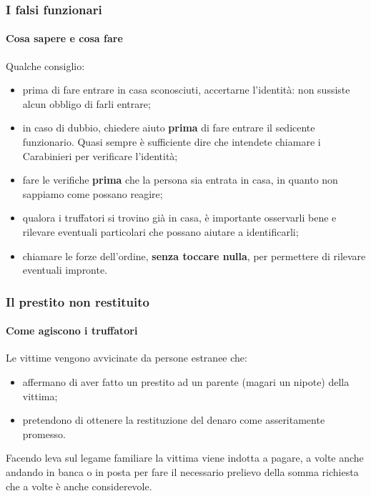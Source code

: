 \documentclass[11pt]{beamer}
\begin{document}
	\begin{frame}
		\frametitle{I falsi funzionari}
		\framesubtitle{Cosa sapere e cosa fare}
		
		Qualche consiglio:
		
		\begin{itemize}
			\item prima di fare entrare in casa sconosciuti, accertarne l'identità: non sussiste alcun obbligo di farli entrare;
			\item in caso di dubbio, chiedere aiuto \textbf{prima} di fare entrare il sedicente funzionario. Quasi sempre è sufficiente dire che intendete chiamare i Carabinieri per verificare l'identità;
			\item fare le verifiche \textbf{prima} che la persona sia entrata in casa, in quanto non sappiamo come possano reagire;
			\item qualora i truffatori si trovino già in casa, è importante osservarli bene e rilevare eventuali particolari che possano aiutare a identificarli;
			\item chiamare le forze dell'ordine, \textbf{senza toccare nulla}, per permettere di rilevare eventuali impronte.
		\end{itemize}
		

		
	\end{frame}
	
	\begin{frame}
		\frametitle{Il prestito non restituito}
		\framesubtitle{Come agiscono i truffatori}
		Le vittime vengono avvicinate da persone estranee che:
		\begin{itemize}
			\item affermano di aver fatto un prestito ad un parente (magari un nipote) della vittima;
			\item pretendono di ottenere la restituzione del denaro come asseritamente promesso.
		\end{itemize}
		
		Facendo leva sul legame familiare la vittima viene indotta a pagare, a volte anche andando in banca o in posta per fare il necessario prelievo della somma richiesta che a volte è anche considerevole.
	\end{frame}
	
\end{document}
